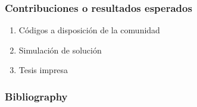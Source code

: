 \documentclass[
	11pt, %
]{beamer}
\begin{document}
\begin{frame}

  \frametitle{Contribuciones o resultados esperados}

  \begin{enumerate}
  \item<1-> Códigos a disposición de la comunidad
  \item<2-> Simulación de solución
  \item<3-> Tesis impresa
  \end{enumerate}
  
\end{frame}

\begin{frame}
  \frametitle{Bibliography}
  
  
\end{frame}
\end{document}
